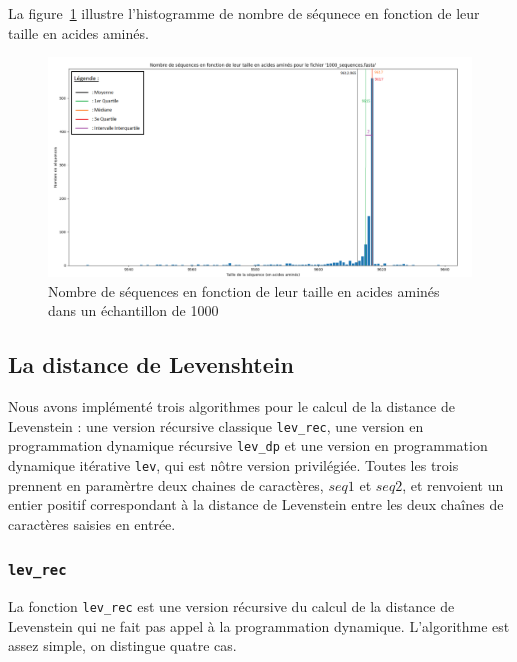 \documentclass[12pt]{article}
\begin{document}
\newpage 

La figure~\ref{graph:taille} illustre l'histogramme de nombre de séqunece en fonction de leur taille en acides aminés.

    \begin{figure}[!h]
        \centering
        \includegraphics[scale = 0.4]{Images/Stats/Codons/graphe_taille_acide.png}
        \caption{Nombre de séquences en fonction de leur taille en acides aminés dans un échantillon de 1000}      
        \label{graph:taille}
    \end{figure}
    
    
    
\subsection{La distance de Levenshtein}
\label{subsec:lev}

Nous avons implémenté trois algorithmes pour le calcul de la distance de Levenstein : une version récursive classique \texttt{lev\_rec}, une version en programmation dynamique récursive \texttt{lev\_dp} et une version en programmation dynamique itérative  \texttt{lev}, qui est nôtre version privilégiée. Toutes les trois prennent en paramèrtre deux chaines de caractères, $seq1$ et $seq2$, et renvoient un entier positif correspondant à la distance de Levenstein entre les deux chaînes de caractères saisies en entrée.

\subsubsection{\texttt{lev\_rec}}
La fonction \texttt{lev\_rec} est une version récursive du calcul de la distance de Levenstein qui ne fait pas appel à la programmation dynamique.
L'algorithme est assez simple, on distingue quatre cas.\\
\end{document}
